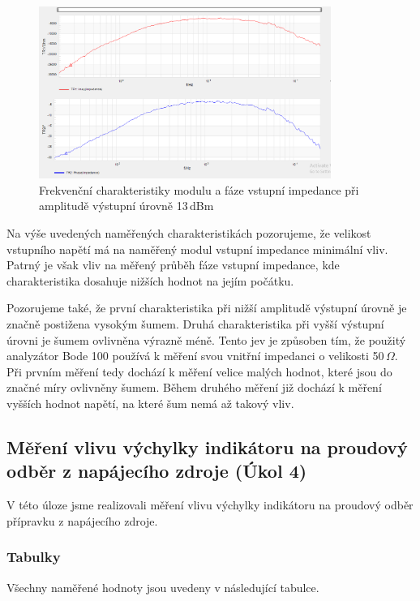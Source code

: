 \documentclass[a4paper, czech]{article}
\begin{document}
\begin{figure}[H]
    \centering
    \includegraphics[width=0.85\textwidth]{impedance_13dbm_uloha8.png}
    \caption{Frekvenční charakteristiky modulu a fáze vstupní impedance při amplitudě výstupní úrovně 13\,dBm}
\end{figure}

Na výše uvedených naměřených charakteristikách pozorujeme, že velikost vstupního napětí má na naměřený modul vstupní impedance minimální vliv.
Patrný je však vliv na měřený průběh fáze vstupní impedance, kde charakteristika dosahuje nižších hodnot na jejím počátku.

Pozorujeme také, že první charakteristika při nižší amplitudě výstupní úrovně je značně postižena vysokým šumem.
Druhá charakteristika při vyšší výstupní úrovni je šumem ovlivněna výrazně méně.
Tento jev je způsoben tím, že použitý analyzátor Bode 100 používá k měření svou vnitřní impedanci o velikosti 50\,$\Omega$.
Při prvním měření tedy dochází k měření velice malých hodnot, které jsou do značné míry ovlivněny šumem.
Během druhého měření již dochází k měření vyšších hodnot napětí, na které šum nemá až takový vliv.

\subsection{Měření vlivu výchylky indikátoru na proudový odběr z napájecího zdroje (Úkol 4)}

V této úloze jsme realizovali měření vlivu výchylky indikátoru na proudový odběr přípravku z napájecího zdroje.

\subsubsection{Tabulky}

Všechny naměřené hodnoty jsou uvedeny v následující tabulce.
\end{document}

